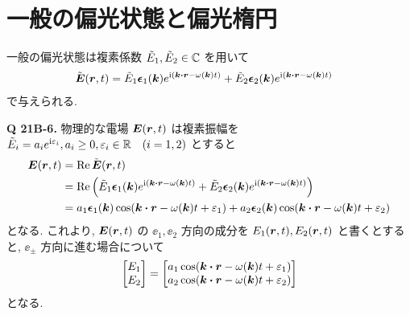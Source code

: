 \documentclass[a4paper,dvipdfmx]{jsarticle}
\theoremstyle{definition}
\begin{document}
\section{一般の偏光状態と偏光楕円}
一般の偏光状態は複素係数 $\tilde{E}_1, \tilde{E}_2\in\mathbb{C}$ を用いて
\begin{align}
  \tilde{\EE}(\rr, t) & = \tilde{E}_1\ee_1(\kk)e^{\ii(\kk\vdot\rr - \omega(\kk)t)} + \tilde{E}_2\ee_2(\kk)e^{\ii(\kk\vdot\rr - \omega(\kk)t)} \label{tilde E def}
\end{align}
で与えられる.

\textbf{Q 21B-6.} 物理的な電場 $\vb*{E}(\vb*{r}, t)$ は複素振幅を $\tilde{E}_i = a_ie^{\mathrm{i}\varepsilon_i}, a_i \geq 0, \varepsilon_i\in\mathbb{R} \quad (i = 1, 2)$ とすると
\begin{align}
  \EE(\rr, t) & = \Re\tilde{\EE}(\rr, t)                                                                                                                      \\
              & = \Re\qty(\tilde{E}_1\ee_1(\kk)e^{\ii(\kk\vdot\rr - \omega(\kk)t)} + \tilde{E}_2\ee_2(\kk)e^{\ii(\kk\vdot\rr - \omega(\kk)t)})                \\
              & = a_1\ee_1(\kk)\cos(\kk\vdot\rr - \omega(\kk)t + \varepsilon_1) + a_2\ee_2(\kk)\cos(\kk\vdot\rr - \omega(\kk)t + \varepsilon_2) \label{E def}
\end{align}
となる. これより, $\vb*{E}(\vb*{r}, t)$ の $\ee_1, \ee_2$ 方向の成分を $E_1(\vb*{r}, t), E_2(\vb*{r}, t)$ と書くとすると, $\ee_\pm$ 方向に進む場合について
\begin{align}
  \mqty[E_1 \\ E_2] = \mqty[a_1\cos(\kk\vdot\rr - \omega(\kk)t + \varepsilon_1) \\ a_2\cos(\kk\vdot\rr - \omega(\kk)t + \varepsilon_2)] \label{genral E vector}
\end{align}
となる.
\end{document}
